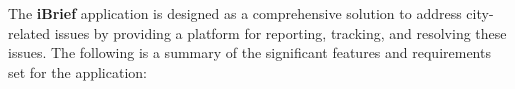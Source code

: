 The \textbf{iBrief} application is designed as a comprehensive solution to address city-related issues by providing a platform for reporting, tracking, and resolving these issues. The following is a summary of the significant features and requirements set for the application: